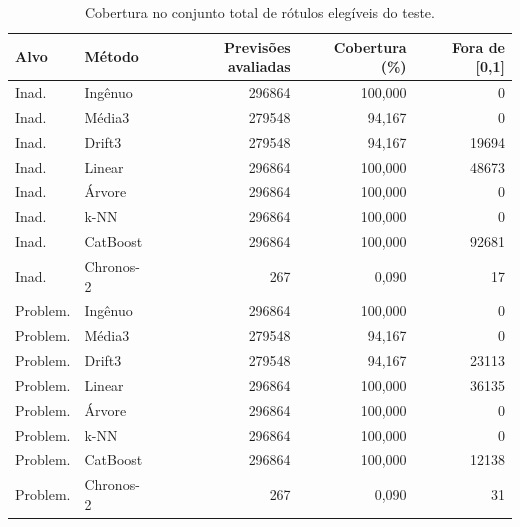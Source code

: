 \begin{table}[ht]
\centering
\caption{Cobertura no conjunto total de rótulos elegíveis do teste.}
\label{tab:coverage}
\small
\begin{tabular}{llrrr}
\hline
Alvo & Método & Previsões avaliadas & Cobertura (\%) & Fora de [0,1] \\
\hline
Inad. & Ingênuo & 296864 & 100,000 & 0 \\
Inad. & Média3 & 279548 & 94,167 & 0 \\
Inad. & Drift3 & 279548 & 94,167 & 19694 \\
Inad. & Linear & 296864 & 100,000 & 48673 \\
Inad. & Árvore & 296864 & 100,000 & 0 \\
Inad. & k-NN & 296864 & 100,000 & 0 \\
Inad. & CatBoost & 296864 & 100,000 & 92681 \\
Inad. & Chronos-2 & 267 & 0,090 & 17 \\
Problem. & Ingênuo & 296864 & 100,000 & 0 \\
Problem. & Média3 & 279548 & 94,167 & 0 \\
Problem. & Drift3 & 279548 & 94,167 & 23113 \\
Problem. & Linear & 296864 & 100,000 & 36135 \\
Problem. & Árvore & 296864 & 100,000 & 0 \\
Problem. & k-NN & 296864 & 100,000 & 0 \\
Problem. & CatBoost & 296864 & 100,000 & 12138 \\
Problem. & Chronos-2 & 267 & 0,090 & 31 \\
\hline
\end{tabular}
\end{table}